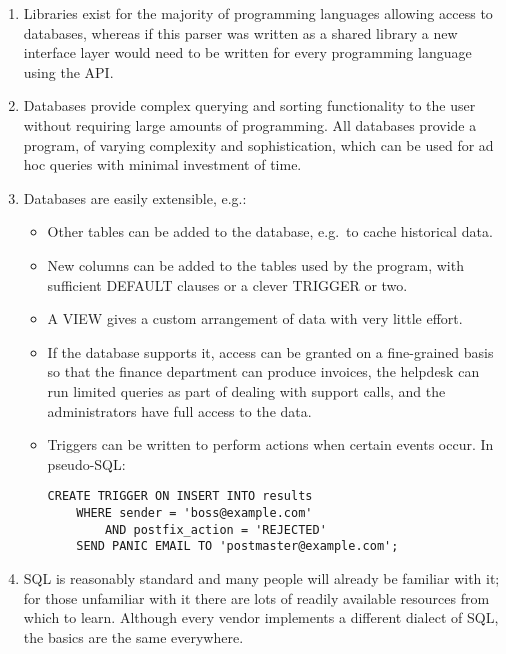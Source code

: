 \documentclass[a4paper,12pt,draft]{article}
\begin{document}
\begin{enumerate}

    \item Libraries exist for the majority of programming languages
        allowing access to databases, whereas if this parser was written as
        a shared library a new interface layer would need to be written for
        every programming language using the API\@.

    \item Databases provide complex querying and sorting functionality to
        the user without requiring large amounts of programming.  All
        databases provide a program, of varying complexity and
        sophistication, which can be used for ad hoc queries with minimal
        investment of time.

    \item Databases are easily extensible, e.g.:
        
        \begin{itemize}

            \item Other tables can be added to the database, e.g.\ to cache
                historical data.

            \item New columns can be added to the tables used by the
                program, with sufficient DEFAULT clauses or a clever
                TRIGGER or two.

            \item A VIEW gives a custom arrangement of data with very
                little effort.

            \item If the database supports it, access can be granted on a
                fine-grained basis so that the finance department can
                produce invoices, the helpdesk can run limited queries as
                part of dealing with support calls, and the administrators
                have full access to the data.

            \item Triggers can be written to perform actions when certain
                events occur.  In pseudo-SQL\@:

\begin{verbatim}
CREATE TRIGGER ON INSERT INTO results
    WHERE sender = 'boss@example.com'
        AND postfix_action = 'REJECTED'
    SEND PANIC EMAIL TO 'postmaster@example.com';
\end{verbatim}

        \end{itemize}


    \item SQL is reasonably standard and many people will already be
        familiar with it; for those unfamiliar with it there are lots of
        readily available resources from which to learn.  Although every
        vendor implements a different dialect of SQL, the basics are the
        same everywhere.

\end{enumerate}
\end{document}
